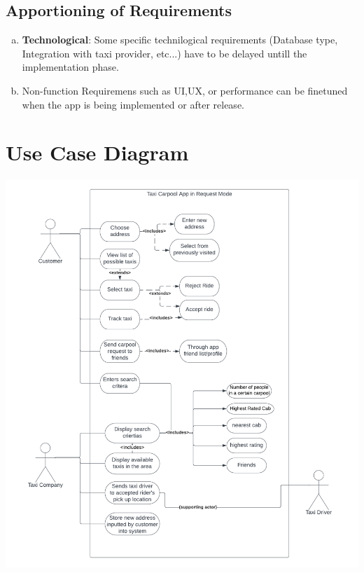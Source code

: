\documentclass[]{article}
\begin{document}
\subsection{Apportioning of Requirements}
\label{sub:apportioning_of_requirements}

\begin{enumerate}[a)]
	\item \textbf{Technological}: Some specific technilogical requirements (Database type, Integration with taxi provider, etc...) have to be delayed untill the implementation phase.
	\item Non-function Requiremens such as UI,UX, or performance can be finetuned when the app is being implemented or after release.
\end{enumerate}


\section{Use Case Diagram}
\label{sec:use_case_diagram}
\includegraphics[scale = 0.8]{Use_Case_Diagram.png}

\end{document}
